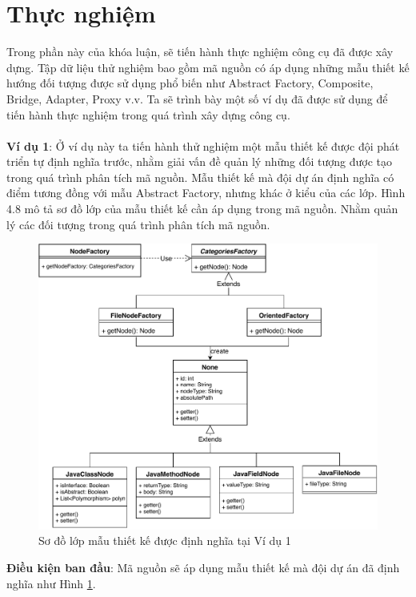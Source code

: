 \documentclass[12pt]{report}
\begin{document}
\section{Thực nghiệm}
Trong phần này của khóa luận, sẽ tiến hành thực nghiệm công cụ đã được xây dựng. Tập dữ liệu thử nghiệm bao gồm mã nguồn có áp dụng những mẫu thiết kế hướng đối tượng được sử dụng phổ biến như Abstract Factory, Composite, Bridge, Adapter, Proxy v.v.
\noindent Ta sẽ trình bày một số ví dụ đã được sử dụng để tiến hành thực nghiệm trong quá trình xây dựng công cụ.\\\\
\noindent \textbf{Ví dụ 1}: Ở ví dụ này ta tiến hành thử nghiệm một mẫu thiết kế được đội phát triển tự định nghĩa trước, nhằm giải vấn đề quản lý những đối tượng được tạo trong quá trình phân tích mã nguồn. Mẫu thiết kế mà đội dự án định nghĩa có điểm tương đồng với mẫu Abstract Factory, nhưng khác ở kiểu của các lớp. Hình 4.8  mô tả sơ đồ lớp của mẫu thiết kế cần áp dụng trong mã nguồn. Nhằm quản lý các đối tượng trong quá trình phân tích mã nguồn.\\
\begin{figure}[h]
	\centering
	\includegraphics[scale=0.7]{images/node_factory.pdf}
	\caption{Sơ đồ lớp mẫu thiết kế được định nghĩa tại Ví dụ 1}
	\label{fig:node_factory}
\end{figure}

\noindent \textbf{Điều kiện ban đầu}: Mã nguồn sẽ áp dụng mẫu thiết kế mà đội dự án đã định nghĩa như Hình \ref{fig:node_factory}.
\end{document}
